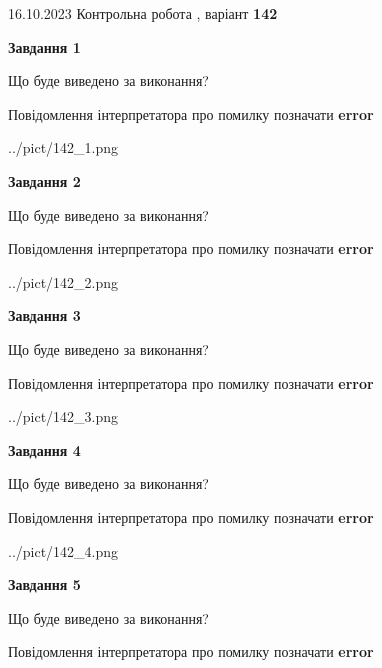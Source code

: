 \documentclass[12pt, ukrainian]{article}
\begin{document}
{\Large{16.10.2023 Контрольна робота , варіант  \No \textbf { 142 }\par}}
{
\begin {large}
{\begin {center}\textbf{Завдання 1}\end {center}}\par
Що буде виведено за виконання? \par
Повідомлення інтерпретатора про помилку позначати \textbf{error}

\begin{center}
	{../pict/142_1.png}
\end{center}
\newpage

{\begin {center}\textbf{Завдання 2}\end {center}}\par
Що буде виведено за виконання? \par
Повідомлення інтерпретатора про помилку позначати \textbf{error}

\begin{center}
	{../pict/142_2.png}
\end{center}
\newpage

{\begin {center}\textbf{Завдання 3}\end {center}}\par
Що буде виведено за виконання? \par
Повідомлення інтерпретатора про помилку позначати \textbf{error}

\begin{center}
	{../pict/142_3.png}
\end{center}
\newpage

{\begin {center}\textbf{Завдання 4}\end {center}}\par
Що буде виведено за виконання? \par
Повідомлення інтерпретатора про помилку позначати \textbf{error}

\begin{center}
	{../pict/142_4.png}
\end{center}
\newpage

{\begin {center}\textbf{Завдання 5}\end {center}}\par
Що буде виведено за виконання? \par
Повідомлення інтерпретатора про помилку позначати \textbf{error}


\end{large}}
\end{document}
